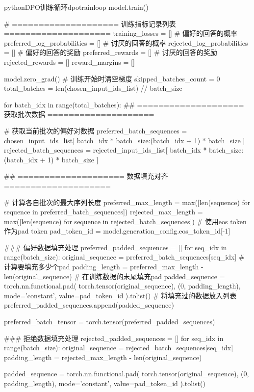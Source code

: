 \documentclass[lang=cn,newtx,10pt,scheme=chinese]{elegantbook}
\begin{document}
\begin{codebox}{python}{DPO训练循环}{dpotrainloop}
model.train()

# ==================== 训练指标记录列表 ====================
training_losses = []
# 偏好的回答的概率
preferred_log_probabilities = []
# 讨厌的回答的概率
rejected_log_probabilities = []
# 偏好的回答的奖励
preferred_rewards = []
# 讨厌的回答的奖励
rejected_rewards = []
reward_margins = []

model.zero_grad()  # 训练开始时清空梯度
skipped_batches_count = 0
total_batches = len(chosen_input_ids_list) // batch_size

for batch_idx in range(total_batches):
    ## ==================== 获取批次数据 ====================
    
    # 获取当前批次的偏好对数据
    preferred_batch_sequences = chosen_input_ids_list[
        batch_idx * batch_size:(batch_idx + 1) * batch_size
    ]
    rejected_batch_sequences = rejected_input_ids_list[
        batch_idx * batch_size:(batch_idx + 1) * batch_size
    ]

    ## ==================== 数据填充对齐 ====================
    
    # 计算各自批次的最大序列长度
    preferred_max_length = max([len(sequence) for sequence in preferred_batch_sequences])
    rejected_max_length = max([len(sequence) for sequence in rejected_batch_sequences])
    # 使用eos token作为pad token
    pad_token_id = model.generation_config.eos_token_id[-1]
    
    ### 偏好数据填充处理
    preferred_padded_sequences = []
    for seq_idx in range(batch_size):
        original_sequence = preferred_batch_sequences[seq_idx]
        # 计算要填充多少个pad
        padding_length = preferred_max_length - len(original_sequence)
        # 在训练数据的末尾填充pad
        padded_sequence = torch.nn.functional.pad(
            torch.tensor(original_sequence), 
            (0, padding_length), 
            mode='constant', 
            value=pad_token_id
        ).tolist()
        # 将填充过的数据放入列表
        preferred_padded_sequences.append(padded_sequence)
    
    preferred_batch_tensor = torch.tensor(preferred_padded_sequences)
    
    ### 拒绝数据填充处理
    rejected_padded_sequences = []
    for seq_idx in range(batch_size):
        original_sequence = rejected_batch_sequences[seq_idx]
        padding_length = rejected_max_length - len(original_sequence)
        
        padded_sequence = torch.nn.functional.pad(
            torch.tensor(original_sequence), 
            (0, padding_length), 
            mode='constant', 
            value=pad_token_id
        ).tolist()
        

\end{codebox}
\end{document}
